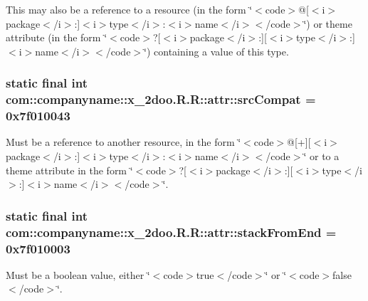 This may also be a reference to a resource (in the form \char`\"{}$<$code$>$@\mbox{[}$<$i$>$package$<$/i$>$:\mbox{]}$<$i$>$type$<$/i$>$:$<$i$>$name$<$/i$>$$<$/code$>$\char`\"{}) or theme attribute (in the form \char`\"{}$<$code$>$?\mbox{[}$<$i$>$package$<$/i$>$:\mbox{]}\mbox{[}$<$i$>$type$<$/i$>$:\mbox{]}$<$i$>$name$<$/i$>$$<$/code$>$\char`\"{}) containing a value of this type. \hypertarget{classcom_1_1companyname_1_1x__2doo_1_1_r_1_1attr_6241c33fa68aa41a7edcae8440f4f137}{
\subsubsection[{srcCompat}]{\setlength{\rightskip}{0pt plus 5cm}static final int com::companyname::x\_\-2doo.R.R::attr::srcCompat = 0x7f010043}}
\label{classcom_1_1companyname_1_1x__2doo_1_1_r_1_1attr_6241c33fa68aa41a7edcae8440f4f137}


Must be a reference to another resource, in the form \char`\"{}$<$code$>$@\mbox{[}+\mbox{]}\mbox{[}$<$i$>$package$<$/i$>$:\mbox{]}$<$i$>$type$<$/i$>$:$<$i$>$name$<$/i$>$$<$/code$>$\char`\"{} or to a theme attribute in the form \char`\"{}$<$code$>$?\mbox{[}$<$i$>$package$<$/i$>$:\mbox{]}\mbox{[}$<$i$>$type$<$/i$>$:\mbox{]}$<$i$>$name$<$/i$>$$<$/code$>$\char`\"{}. \hypertarget{classcom_1_1companyname_1_1x__2doo_1_1_r_1_1attr_aaf52bf7d1580a42f26349c3299f95eb}{
\subsubsection[{stackFromEnd}]{\setlength{\rightskip}{0pt plus 5cm}static final int com::companyname::x\_\-2doo.R.R::attr::stackFromEnd = 0x7f010003}}
\label{classcom_1_1companyname_1_1x__2doo_1_1_r_1_1attr_aaf52bf7d1580a42f26349c3299f95eb}


Must be a boolean value, either \char`\"{}$<$code$>$true$<$/code$>$\char`\"{} or \char`\"{}$<$code$>$false$<$/code$>$\char`\"{}. 

